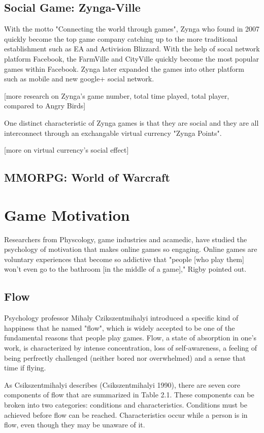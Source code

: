 \subsection{Social Game: Zynga-Ville}
With the motto  "Connecting the world through games", Zynga who found in 2007 quickly become the top game company catching up to the more traditional establishment such as EA and Activision Blizzard. With the help of socal network platform Facebook, the FarmVille and CityVille quickly become the most popular games within Facebook. Zynga later expanded the games into other platform such as mobile and  new google+ social network. 

[more research on Zynga's game number, total time played, total player, compared to Angry Birds]

One distinct characteristic of Zynga games is that they are social and they are all interconnect through an exchangable virtual currency "Zynga Points". 

[more on virtual currency's social effect]

\subsection{MMORPG: World of Warcraft}

\section{Game Motivation}
Researchers from Physcology, game industries and acamedic, have studied the psychology of motivation that makes online games so engaging. Online games are voluntary experiences that become so addictive that "people [who play them] won't even go to the bathroom [in the middle of a game]," Rigby pointed out. 

\subsection{Flow}
Psychology professor Mihaly Czikszentmihalyi introduced a specific kind of happiness that he named "flow", which is widely accepted to be one of the fundamental reasons that people play games. Flow, a state of absorption in one's work, is characterized by intense concentration, loss of self-awareness, a feeling of being perfrectly challenged (neither bored nor overwhelmed) and a sense that time if flying. 

As Csikszentmihalyi describes (Csikszentmihalyi 1990), there are seven core components of flow that are summarized in Table 2.1. These components can be broken into two categories: conditions and characteristics. Conditions must be achieved before flow can be reached. Characteristics occur while a person is in flow, even though they may be unaware of it.

